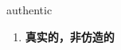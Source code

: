 
\begin{frame}
{\huge authentic}
\begin{center}
\begin{enumerate}\Large
  \item \textbf{真实的，非仿造的}
\end{enumerate}
\end{center}
\end{frame}
